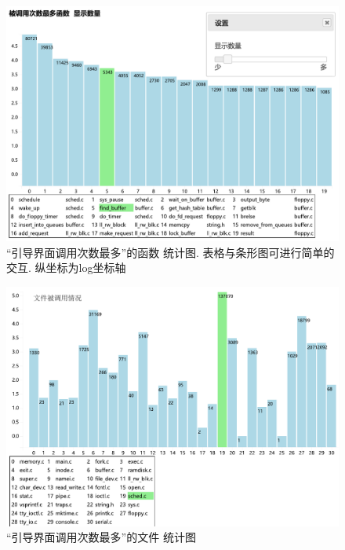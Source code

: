 \documentclass{ctexart}
\begin{document}
\begin{figure}[htbp]
	\centering
	\includegraphics[width=\textwidth,natwidth=594 ,natheight=419]{img/calledMaxFunc.pdf}
	\caption[]{“引导界面调用次数最多”的函数 统计图. 表格与条形图可进行简单的交互. 纵坐标为log坐标轴}
	\label{fig:calledMaxFuncgraph}
\end{figure}

\begin{figure}[htbp]
	\centering
	\includegraphics[width=\textwidth,natwidth=577 ,natheight=416]{img/calledFile.pdf}
	\caption[]{“引导界面调用次数最多”的文件 统计图}
	\label{fig:calledMaxFilegraph}
\end{figure}
\end{document}
